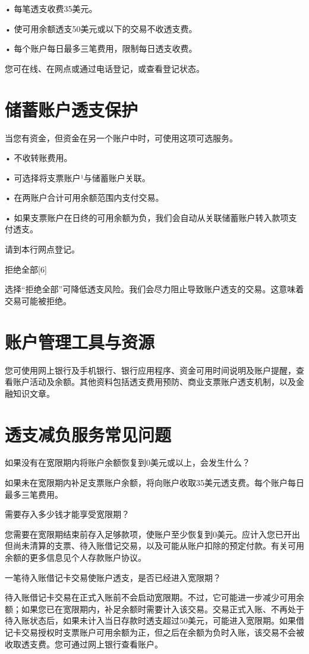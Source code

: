 \documentclass[UTF8,fontset=none,11pt,a4paper]{ctexart}
\begin{document}
• 每笔透支收费35美元。


• 使可用余额透支50美元或以下的交易不收透支费。


• 每个账户每日最多三笔费用，限制每日透支收费。


您可在线、在网点或通过电话登记，或查看登记状态。


\section*{储蓄账户透支保护}
当您有资金，但资金在另一个账户中时，可使用这项可选服务。


• 不收转账费用。


• 可选择将支票账户¹与储蓄账户关联。


• 在两账户合计可用余额范围内支付交易。


• 如果支票账户在日终的可用余额为负，我们会自动从关联储蓄账户转入款项支付透支。


请到本行网点登记。


拒绝全部[6]


选择“拒绝全部”可降低透支风险。我们会尽力阻止导致账户透支的交易。这意味着交易可能被拒绝。


\section*{账户管理工具与资源}
您可使用网上银行及手机银行、银行应用程序、资金可用时间说明及账户提醒，查看账户活动及余额。其他资料包括透支费用预防、商业支票账户透支机制，以及金融知识文章。


\section*{透支减负服务常见问题}
如果没有在宽限期内将账户余额恢复到0美元或以上，会发生什么？


如果未在宽限期内补足支票账户余额，将向账户收取35美元透支费。每个账户每日最多三笔费用。


需要存入多少钱才能享受宽限期？


您需要在宽限期结束前存入足够款项，使账户至少恢复到0美元。应计入您已开出但尚未清算的支票、待入账借记交易，以及可能从账户扣除的预定付款。有关可用余额的更多信息见个人存款账户协议。


一笔待入账借记卡交易使账户透支，是否已经进入宽限期？


待入账借记卡交易在正式入账前不会启动宽限期。不过，它可能进一步减少可用余额；如果您已在宽限期内，补足余额时需要计入该交易。交易正式入账、不再处于待入账状态后，如果未计入当日存款时透支超过50美元，可能进入宽限期。如果借记卡交易授权时支票账户可用余额为正，但之后在余额为负时入账，该交易不会被收取透支费。您可通过网上银行查看账户。
\end{document}
